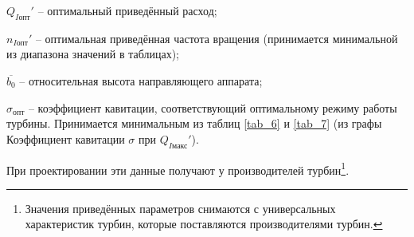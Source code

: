 \vspace{0.5cm}

$Q_{I\text{опт}}'$ -- оптимальный приведённый расход;

$n_{I\text{опт}}'$ -- оптимальная приведённая частота вращения (принимается минимальной из диапазона значений в таблицах);

$\overline{b_0}$ -- относительная высота направляющего аппарата;

$\sigma_{\text{опт}}$ -- коэффициент кавитации, соответствующий оптимальному режиму работы турбины. Принимается минимальным из таблиц \ref{tab_6} и \ref{tab_7} (из графы Коэффициент кавитации $\sigma$ при $Q_{I\text{макс}}'$).

\vspace{0.5cm}

При проектировании эти данные получают у производителей турбин\footnote{Значения приведённых параметров снимаются с универсальных характеристик турбин, которые поставляются производителями турбин.}.


